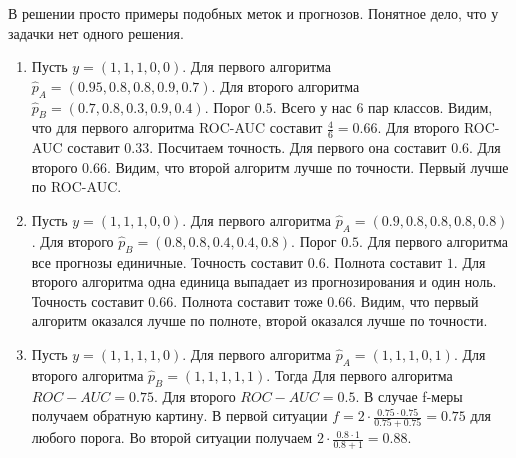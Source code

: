 \documentclass[12pt, a4paper, oneside]{article}
\theoremstyle{plain} %
\theoremstyle{definition}
\begin{document}
\begin{solution} 
В решении просто примеры подобных меток и прогнозов. Понятное дело, что у задачки нет одного решения. 
\begin{enumerate}

	\item Пусть $y = (1,1,1,0,0)$. Для первого алгоритма $\hat p_A = (0.95, 0.8, 0.8, 0.9, 0.7)$. Для второго алгоритма $\hat p_B = (0.7, 0.8, 0.3, 0.9, 0.4)$. Порог $0.5$. Всего у нас $6$ пар классов. Видим, что для первого алгоритма ROC-AUC составит $\frac{4}{6} = 0.66$. Для второго ROC-AUC составит $0.33$.  Посчитаем точность. Для первого она составит $0.6$. Для второго $0.66$. Видим, что второй алгоритм лучше по точности. Первый лучше по ROC-AUC. 
	
	\item  Пусть $y = (1,1,1,0,0)$. Для первого алгоритма $\hat p_A = (0.9, 0.8, 0.8, 0.8, 0.8)$. Для второго $\hat p_B = (0.8,0.8,0.4,0.4,0.8)$.  Порог $0.5$. Для первого алгоритма все прогнозы единичные. Точность составит $0.6$. Полнота составит $1$. Для второго алгоритма одна единица выпадает из прогнозирования и один ноль. Точность составит $0.66$.  Полнота составит тоже $0.66$. Видим, что первый алгоритм оказался лучше по полноте, второй оказался лучше по точности.  
	
	\item  Пусть $y = (1,1,1,1,0)$. Для первого алгоритма $\hat p_A = (1,1,1,0,1)$. Для второго алгоритма $\hat p_B = (1,1,1,1,1)$. Тогда Для первого алгоритма $ROC-AUC = 0.75$. Для второго $ROC-AUC = 0.5$. В случае f-меры получаем обратную картину. В первой ситуации $f = 2 \cdot \frac{0.75 \cdot 0.75}{0.75 + 0.75} = 0.75$ для любого порога. Во второй ситуации получаем $2 \cdot \frac{0.8 \cdot 1}{0.8 + 1} =0.88$. 
\end{enumerate}
\end{solution}

\end{document}
